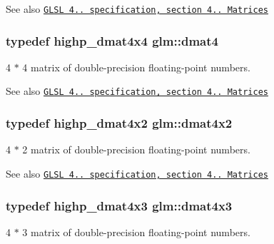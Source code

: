 \begin{DoxySeeAlso}{See also}
\href{http://www.opengl.org/registry/doc/GLSLangSpec.4.20.8.pdf}{\tt G\+L\+SL 4.. specification, section 4.. Matrices} 
\end{DoxySeeAlso}
\subsubsection[{\texorpdfstring{dmat4}{dmat4}}]{\setlength{\rightskip}{0pt plus 5cm}typedef highp\+\_\+dmat4x4 {\bf glm\+::dmat4}}\hypertarget{group__core__types_ga7f7c1300ebfd19d573e9deb1e8758b54}{}\label{group__core__types_ga7f7c1300ebfd19d573e9deb1e8758b54}
4 $\ast$ 4 matrix of double-\/precision floating-\/point numbers.

\begin{DoxySeeAlso}{See also}
\href{http://www.opengl.org/registry/doc/GLSLangSpec.4.20.8.pdf}{\tt G\+L\+SL 4.. specification, section 4.. Matrices} 
\end{DoxySeeAlso}
\subsubsection[{\texorpdfstring{dmat4x2}{dmat4x2}}]{\setlength{\rightskip}{0pt plus 5cm}typedef highp\+\_\+dmat4x2 {\bf glm\+::dmat4x2}}\hypertarget{group__core__types_gab3d51ce41e6f0aa267d3e185cee09c44}{}\label{group__core__types_gab3d51ce41e6f0aa267d3e185cee09c44}
4 $\ast$ 2 matrix of double-\/precision floating-\/point numbers.

\begin{DoxySeeAlso}{See also}
\href{http://www.opengl.org/registry/doc/GLSLangSpec.4.20.8.pdf}{\tt G\+L\+SL 4.. specification, section 4.. Matrices} 
\end{DoxySeeAlso}
\subsubsection[{\texorpdfstring{dmat4x3}{dmat4x3}}]{\setlength{\rightskip}{0pt plus 5cm}typedef highp\+\_\+dmat4x3 {\bf glm\+::dmat4x3}}\hypertarget{group__core__types_gaa4a157ac183c5bd5dcbd555a94b1b505}{}\label{group__core__types_gaa4a157ac183c5bd5dcbd555a94b1b505}
4 $\ast$ 3 matrix of double-\/precision floating-\/point numbers.

